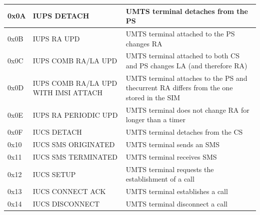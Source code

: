 \documentclass[master,english]{hgbthesis}
\begin{document}
{\begin{longtable}{|l|p{4cm}|p{8cm}|}
		0x0A         & IUPS DETACH                          & UMTS terminal detaches from the PS                                                                         \\ \hline

		0x0B         & IUPS RA UPD                          & UMTS terminal attached to the PS changes RA                                                                \\ \hline

		0x0C         & IUPS COMB RA/LA UPD                  & UMTS terminal attached to both CS and PS changes LA (and therefore RA)                                     \\ \hline

		0x0D         & IUPS COMB RA/LA UPD WITH IMSI ATTACH & UMTS terminal attaches to the PS and thecurrent RA differs from the one stored in the SIM                  \\ \hline

		0x0E         & IUPS RA PERIODIC UPD                 & UMTS terminal does not change RA for longer than a timer                                                   \\ \hline

		0x0F         & IUCS DETACH                          & UMTS terminal detaches from the CS                                                                         \\ \hline

		0x10         & IUCS SMS ORIGINATED                  & UMTS terminal sends an SMS                                                                                 \\ \hline

		0x11         & IUCS SMS TERMINATED                  & UMTS terminal receives SMS                                                                                 \\ \hline

		0x12         & IUCS SETUP                           & UMTS terminal requests the establishment of a call                                                         \\ \hline

		0x13         & IUCS CONNECT ACK                     & UMTS terminal establishes a call                                                                           \\ \hline

		0x14         & IUCS DISCONNECT                      & UMTS terminal disconnect a call                                                                            \\ \hline


\end{longtable}}
\end{document}
